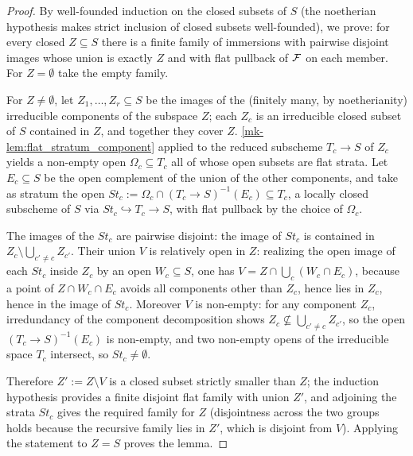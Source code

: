 \begin{proof}
  \leanok
  By well-founded induction on the closed subsets of \(S\) (the noetherian
  hypothesis makes strict inclusion of closed subsets well-founded), we prove:
  for every closed \(Z \subseteq S\) there is a finite family of immersions
  with pairwise disjoint images whose union is exactly \(Z\) and with flat
  pullback of \(\mathcal{F}\) on each member.  For \(Z = \emptyset\) take the empty
  family.

  For \(Z \neq \emptyset\), let \(Z_1, \dots, Z_r \subseteq S\) be the images
  of the (finitely many, by noetherianity) irreducible components of the
  subspace \(Z\); each \(Z_c\) is an irreducible closed subset of \(S\)
  contained in \(Z\), and together they cover \(Z\).
  \ref{mk-lem:flat_stratum_component} applied to the reduced subscheme
  \(T_c \to S\) of \(Z_c\) yields a non-empty open \(\Omega_c \subseteq T_c\)
  all of whose open subsets are flat strata.  Let
  \(E_c \subseteq S\) be the open complement of the union of the other
  components, and take as stratum the open
  \(\mathit{St}_c := \Omega_c \cap (T_c \to S)^{-1}(E_c) \subseteq T_c\),
  a locally closed subscheme of \(S\) via
  \(\mathit{St}_c \hookrightarrow T_c \to S\), with flat pullback by the
  choice of \(\Omega_c\).

  The images of the \(\mathit{St}_c\) are pairwise disjoint: the image of
  \(\mathit{St}_c\) is contained in \(Z_c \setminus \bigcup_{c' \neq c} Z_{c'}\).
  Their union \(V\) is relatively open in \(Z\): realizing the open image of
  each \(\mathit{St}_c\) inside \(Z_c\) by an open \(W_c \subseteq S\), one has
  \(V = Z \cap \bigcup_c (W_c \cap E_c)\), because a point of
  \(Z \cap W_c \cap E_c\) avoids all components other than \(Z_c\), hence lies
  in \(Z_c\), hence in the image of \(\mathit{St}_c\).  Moreover \(V\) is
  non-empty: for any component \(Z_{c}\), irredundancy of the component
  decomposition shows \(Z_c \not\subseteq \bigcup_{c' \neq c} Z_{c'}\), so the
  open \((T_c \to S)^{-1}(E_c)\) is non-empty, and two non-empty opens of the
  irreducible space \(T_c\) intersect, so \(\mathit{St}_c \neq \emptyset\).

  Therefore \(Z' := Z \setminus V\) is a closed subset strictly smaller than
  \(Z\); the induction hypothesis provides a finite disjoint flat family with
  union \(Z'\), and adjoining the strata \(\mathit{St}_c\) gives the required
  family for \(Z\) (disjointness across the two groups holds because the
  recursive family lies in \(Z'\), which is disjoint from \(V\)).  Applying
  the statement to \(Z = S\) proves the lemma.
\end{proof}

